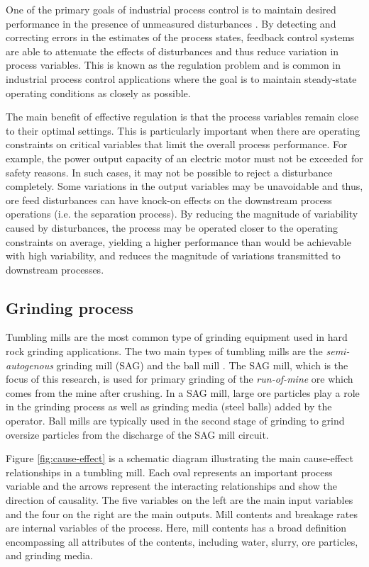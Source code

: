 One of the primary goals of industrial process control is to maintain desired performance in the presence of unmeasured disturbances \citep{astrom_computer_1997}. By detecting and correcting errors in the estimates of the process states, feedback control systems are able to attenuate the effects of disturbances and thus reduce variation in process variables. This is known as the regulation problem and is common in industrial process control applications where the goal is to maintain steady-state operating conditions as closely as possible.

The main benefit of effective regulation is that the process variables remain close to their optimal settings. This is particularly important when there are operating constraints on critical variables that limit the overall process performance. For example, the power output capacity of an electric motor must not be exceeded for safety reasons. In such cases, it may not be possible to reject a disturbance completely. Some variations in the output variables may be unavoidable and thus, ore feed disturbances can have knock-on effects on the downstream process operations (i.e. the separation process). By reducing the magnitude of variability caused by disturbances, the process may be operated closer to the operating constraints on average, yielding a higher performance than would be achievable with high variability, and reduces the magnitude of variations transmitted to downstream processes.

\subsection*{Grinding process}

Tumbling mills are the most common type of grinding equipment used in hard rock grinding applications. The two main types of tumbling mills are the \textit{semi-autogenous} grinding mill (SAG) and the ball mill \citep{king_chapter_2012}. The SAG mill, which is the focus of this research, is used for primary grinding of the \textit{run-of-mine} ore which comes from the mine after crushing. In a SAG mill, large ore particles play a role in the grinding process as well as grinding media (steel balls) added by the operator. Ball mills are typically used in the second stage of grinding to grind oversize particles from the discharge of the SAG mill circuit.

Figure \ref{fig:cause-effect} is a schematic diagram illustrating the main cause-effect relationships in a tumbling mill. Each oval represents an important process variable and the arrows represent the interacting relationships and show the direction of causality. The five variables on the left are the main input variables and the four on the right are the main outputs. Mill contents and breakage rates are internal variables of the process. Here, mill contents has a broad definition encompassing all attributes of the contents, including water, slurry, ore particles, and grinding media.

